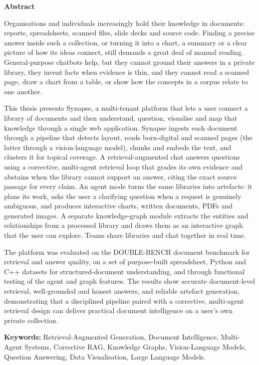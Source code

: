 \clearpage
\thispagestyle{plain}
\begin{center}
{\fontsize{16}{20}\bfseries Abstract\par}
\end{center}
\vspace{0.1in}

Organisations and individuals increasingly hold their knowledge in documents: reports,
spreadsheets, scanned files, slide decks and source code. Finding a precise answer inside
such a collection, or turning it into a chart, a summary or a clear picture of how its ideas
connect, still demands a great deal of manual reading. General-purpose chatbots help, but
they cannot ground their answers in a private library, they invent facts when evidence is
thin, and they cannot read a scanned page, draw a chart from a table, or show how the
concepts in a corpus relate to one another.

This thesis presents Synapse, a multi-tenant platform that lets a user connect a library
of documents and then understand, question, visualise and map that knowledge through a
single web application. Synapse ingests each document through a pipeline that detects
layout, reads born-digital and scanned pages (the latter through a vision-language model),
chunks and embeds the text, and clusters it for topical coverage. A retrieval-augmented
chat answers questions using a corrective, multi-agent retrieval loop that grades its own
evidence and abstains when the library cannot support an answer, citing the exact source
passage for every claim. An agent mode turns the same libraries into artefacts: it plans
its work, asks the user a clarifying question when a request is genuinely ambiguous, and
produces interactive charts, written documents, PDFs and generated images. A separate
knowledge-graph module extracts the entities and relationships from a processed library
and draws them as an interactive graph that the user can explore. Teams share libraries
and chat together in real time.

The platform was evaluated on the DOUBLE-BENCH document benchmark for retrieval and
answer quality, on a set of purpose-built spreadsheet, Python and C++ datasets for
structured-document understanding, and through functional testing of the agent and graph
features. The results show accurate document-level retrieval, well-grounded and honest
answers, and reliable artefact generation, demonstrating that a disciplined pipeline paired
with a corrective, multi-agent retrieval design can deliver practical document intelligence
on a user's own private collection.

\vspace{12pt}
\noindent\textbf{Keywords:} Retrieval-Augmented Generation, Document Intelligence,
Multi-Agent Systems, Corrective RAG, Knowledge Graphs, Vision-Language Models,
Question Answering, Data Visualisation, Large Language Models.

